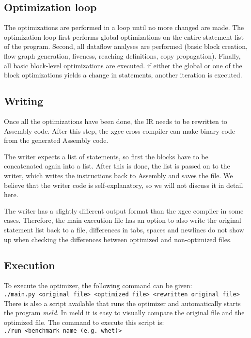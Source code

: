 \documentclass[10pt,a4paper]{article}
\begin{document}
\subsection{Optimization loop}

The optimizations are performed in a loop until no more changed are made. The
optimization loop first performs global optimizations on the entire statement
list of the program. Second, all dataflow analyses are performed (basic block
creation, flow graph generation, liveness, reaching definitions, copy
propagation). Finally, all basic block-level optimizations are executed. if
either the global or one of the block optimizations yields a change in
statements, another iteration is executed.

\subsection{Writing}

Once all the optimizations have been done, the IR needs to be rewritten to
Assembly code. After this step, the xgcc cross compiler can make binary code
from the generated Assembly code.

The writer expects a list of statements, so first the blocks have to be
concatenated again into a list. After this is done, the list is passed on to
the writer, which writes the instructions back to Assembly and saves the file.
We believe that the writer code is self-explanatory, so we will not discuss it
in detail here.

The writer has a slightly different output format than the xgcc compiler in
some cases. Therefore, the main execution file has an option to also write the
original statement list back to a file, differences in tabs, spaces and
newlines do not show up when checking the differences between optimized and
non-optimized files.

\subsection{Execution}

To execute the optimizer, the following command can be given: \\
\texttt{./main.py <original file> <optimized file> <rewritten original file>} \\
There is also a script available that runs the optimizer and automatically
starts the program \emph{meld}. In meld it is easy to visually compare the
original file and the optimized file. The command to execute this script is: \\
\texttt{./run <benchmark name (e.g. whet)>}
\end{document}

